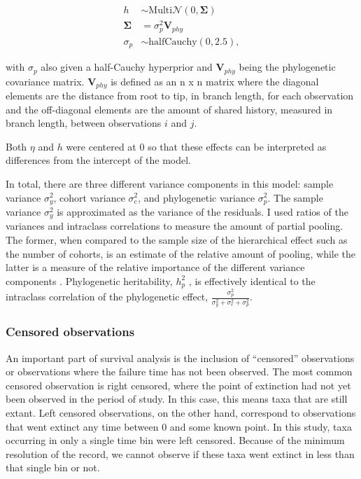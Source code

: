 \documentclass[12pt,letterpaper]{article}
\begin{document}
\begin{align*}
  h &\sim \mathrm{Multi}\mathcal{N}(0, \mathbf{\Sigma}) \\
  \mathbf{\Sigma} &= \sigma_{p}^{2} \mathbf{V}_{phy} \\
  \sigma_{p} &\sim \mathrm{halfCauchy}(0, 2.5),
\end{align*}
 
with \(\sigma_{p}\) also given a half-Cauchy hyperprior and \(\mathbf{V}_{phy}\) being the phylogenetic covariance matrix. \(\mathbf{V}_{phy}\) is defined as an n x n matrix where the diagonal elements are the distance from root to tip, in branch length, for each observation and the off-diagonal elements are the amount of shared history, measured in branch length, between observations \(i\) and \(j\).

Both \(\eta\) and \(h\) were centered at 0 so that these effects can be interpreted as differences from the intercept of the model. 

In total, there are three different variance components in this model: sample variance \(\sigma_{y}^{2}\), cohort variance \(\sigma_{c}^{2}\), and phylogenetic variance \(\sigma_{p}^{2}\). The sample variance \(\sigma_{y}^{2}\) is approximated as the variance of the residuals. I used ratios of the variances and intraclass correlations to measure the amount of partial pooling. The former, when compared to the sample size of the hierarchical effect such as the number of cohorts, is an estimate of the relative amount of pooling, while the latter is a measure of the relative importance of the different variance components \citep{Gelman2007}. Phylogenetic heritability, \(h_{p}^{2}\) \citet{Housworth2004}, is effectively identical to the intraclass correlation of the phylogenetic effect, \(\frac{\sigma_{p}^{2}}{\sigma_{y}^{2} + \sigma_{c}^{2} + \sigma_{p}^{2}}\).



\subsubsection{Censored observations}

An important part of survival analysis is the inclusion of ``censored'' observations \citep{Ibrahim2001,Kleinbaum2005} or observations where the failure time has not been observed. The most common censored observation is right censored, where the point of extinction had not yet been observed in the period of study. In this case, this means taxa that are still extant. Left censored observations, on the other hand, correspond to observations that went extinct any time between 0 and some known point. In this study, taxa occurring in only a single time bin were left censored. Because of the minimum resolution of the record, we cannot observe if these taxa went extinct in less than that single bin or not. 
\end{document}
